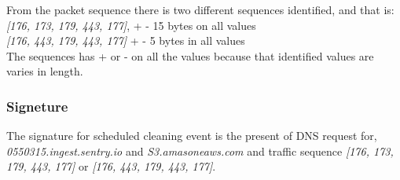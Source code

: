 From the packet sequence there is two different sequences identified, and that is: 
\\
\textit{[176, 173, 179, 443, 177]}, + - 15 bytes on all values 
\\
\textit{[176, 443, 179, 443, 177]} + - 5 bytes in all values
\\
The sequences has + or - on all the values because that identified values are varies in length.

\subsubsection{Signeture}
The signature for scheduled cleaning event is the present of DNS request for, \textit{0550315.ingest.sentry.io} and \textit{S3.amasoneaws.com} and traffic sequence \textit{[176, 173, 179, 443, 177]} or \textit{[176, 443, 179, 443, 177]}.
